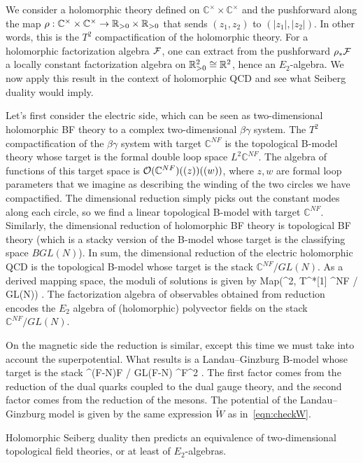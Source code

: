 \documentclass[11pt]{amsart}
\def\C{{\mathbb{C}}}
\begin{document}
We consider a holomorphic theory defined on $\C^\times \times \C^\times$ and the pushforward along the map $\rho: \mathbb C^\times \times \mathbb C^\times \to \mathbb R_{>0} \times \mathbb R_{>0}$ that sends $(z_1,z_2)$ to $(|z_1|, |z_2|)$.
In other words, this is the $T^2$ compactification of the holomorphic theory.
For a holomorphic factorization algebra $\mathcal F$, one can extract from the pushforward $\rho_* \mathcal F$ a locally constant factorization algebra on $\mathbb R_{> 0}^2 \cong \mathbb R^2$, hence an $E_2$-algebra.
We now apply this result in the context of holomorphic QCD and see what Seiberg duality would imply.

Let's first consider the electric side, 
which can be seen as two-dimensional holomorphic BF theory to a complex two-dimensional $\beta\gamma$ system.
The $T^2$ compactification of the $\beta\gamma$ system with target $\C^{NF}$ is the topological B-model theory whose target is the formal double loop space $L^2\C^{NF}$. 
The algebra of functions of this target space is $\cO(\C^{NF}) ((z))((w))$, 
where $z,w$ are formal loop parameters that we imagine as describing the winding of the two circles we have compactified. 
The dimensional reduction simply picks out the constant modes along each circle, so we find a linear topological B-model with target $\C^{NF}$.
Similarly, the dimensional reduction of holomorphic BF theory is topological BF theory (which is a stacky version of the B-model whose target is the classifying space $BGL(N)$).
In sum, the dimensional reduction of the electric holomorphic QCD is the topological B-model whose target is the stack $\C^{NF} / GL(N)$.
As a derived mapping space, the moduli of solutions is given by
\beqn
{\rm Map}\left(\RR^2, T^*[1] \C^{NF} / GL(N)\right) .
\eeqn
The factorization algebra of observables obtained from reduction encodes the $E_2$ algebra of (holomorphic) polyvector fields on the stack~$\C^{NF} / GL(N)$. 

On the magnetic side the reduction is similar, except this time we must take into account the superpotential. 
What results is a Landau--Ginzburg B-model whose target is the stack
\beqn
\C^{(F-N)F} / GL(F-N) \times \C^{F^2} .
\eeqn
The first factor comes from the reduction of the dual quarks coupled to the dual gauge theory, and the second factor comes from the reduction of the mesons. 
The potential of the Landau--Ginzburg model is given by the same expression $\check{W}$ as in~\eqref{eqn:checkW}.

Holomorphic Seiberg duality then predicts an equivalence of two-dimensional topological field theories,
or at least of $E_2$-algebras.
\end{document}
